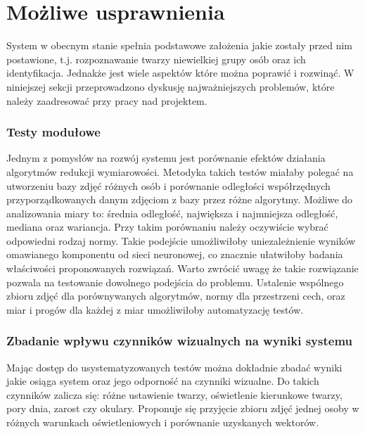 \documentclass[oneside, eng]{mgr}
\begin{document}
\section{Możliwe usprawnienia}

System w obecnym stanie spełnia podstawowe założenia jakie zostały przed nim postawione, t.j. rozpoznawanie twarzy niewielkiej grupy osób oraz ich identyfikacja. Jednakże jest wiele aspektów które można poprawić i rozwinąć. W niniejszej sekcji przeprowadzono dyskusję najważniejszych problemów, które należy zaadresować przy pracy nad projektem.

\subsubsection{Testy modułowe}

Jednym z pomysłów na rozwój systemu jest porównanie efektów działania algorytmów redukcji wymiarowości. Metodyka takich testów miałaby polegać na utworzeniu bazy zdjęć różnych osób i porównanie odległości współrzędnych przyporządkowanych danym zdjęciom z bazy przez różne algorytmy. Możliwe do analizowania miary to: średnia odległość, największa i najmniejsza odległość, mediana oraz wariancja. Przy takim porównaniu należy oczywiście wybrać odpowiedni rodzaj normy. Takie podejście umożliwiłoby uniezależnienie wyników omawianego komponentu od sieci neuronowej, co znacznie ułatwiłoby badania właściwości proponowanych rozwiązań. Warto zwrócić uwagę że takie rozwiązanie pozwala na testowanie dowolnego podejścia do problemu. Ustalenie wspólnego zbioru zdjęć dla porównywanych algorytmów, normy dla przestrzeni cech, oraz miar i progów dla każdej z miar umożliwiłoby automatyzację testów.


\subsubsection{Zbadanie wpływu czynników wizualnych na wyniki systemu}
Mając dostęp do usystematyzowanych testów można dokładnie zbadać wyniki jakie osiąga system oraz jego odporność na czynniki wizualne. Do takich czynników zalicza się: różne ustawienie twarzy, oświetlenie kierunkowe twarzy, pory dnia, zarost czy okulary. Proponuje się przyjęcie zbioru zdjęć jednej osoby w różnych warunkach oświetleniowych i porównanie uzyskanych wektorów.
\end{document}
